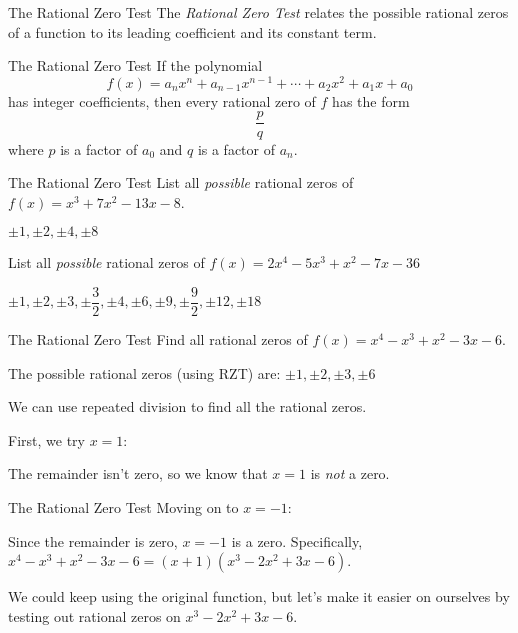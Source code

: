 \documentclass[t]{beamer}
\begin{document}
	\begin{frame}{The Rational Zero Test}
		The \textit{Rational Zero Test} relates the possible rational zeros of a function to its leading coefficient and its constant term.
		
		\pause
		
		\begin{block}{The Rational Zero Test}
			If the polynomial $$f(x) = a_nx^n + a_{n-1}x^{n-1} + \cdots + a_2x^2 + a_1x + a_0$$ has integer coefficients, then every rational zero of $f$ has the form $$\dfrac{p}{q}$$ where $p$ is a factor of $a_0$ and $q$ is a factor of $a_n$.
		\end{block}
	\end{frame}

	\begin{frame}{The Rational Zero Test}
		List all \textit{possible} rational zeros of $f(x) = x^3 + 7x^2 - 13x - 8$. \pause
		
		$\pm 1, \pm 2, \pm 4, \pm 8$ \vspace{18pt}
		
		List all \textit{possible} rational zeros of $f(x) = 2x^4 - 5x^3 + x^2 - 7x - 36$ \pause
		
		$\pm 1, \pm 2, \pm 3, \pm \dfrac32, \pm 4, \pm 6, \pm 9, \pm \dfrac92, \pm 12, \pm 18$
	\end{frame}

	\begin{frame}{The Rational Zero Test}
		Find all rational zeros of $f(x) = x^4 - x^3 + x^2 - 3x - 6$. \pause
		
		The possible rational zeros (using RZT) are: $\pm 1, \pm 2, \pm 3, \pm 6$
		
		We can use repeated division to find all the rational zeros.
		
		First, we try $x = 1$:
		
		\pause
		
		
		\pause
		
		The remainder isn't zero, so we know that $x = 1$ is \textit{not} a zero.		
	\end{frame}

	\begin{frame}{The Rational Zero Test}
		Moving on to $x = -1$: \pause
		
		
		\pause
		
		Since the remainder is zero, $x = -1$ is a zero. Specifically, $x^4 - x^3 + x^2 - 3x - 6 = (x+1)(x^3-2x^2+3x-6)$. \pause
		
		We could keep using the original function, but let's make it easier on ourselves by testing out rational zeros on $x^3 - 2x^2 + 3x - 6$.
	\end{frame}
\end{document}
